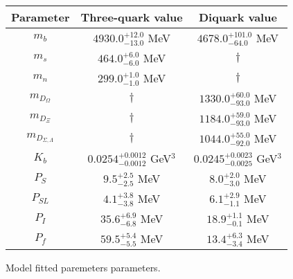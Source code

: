 \begin{tabular}{c | c c}\hline \hline
 Parameter  &  Three-quark value       & Diquark value    \\ \hline
 $m_{b}$ & $4930.0^{+12.0}_{-13.0}$ MeV & $4678.0^{+101.0}_{-64.0}$ MeV \\ 
 $m_{s}$ & $464.0^{+6.0}_{-6.0}$ MeV & $\dagger$ \\ 
 $m_{n}$ & $299.0^{+1.0}_{-1.0}$ MeV & $\dagger$ \\ 
 $m_{D_{\Omega}}$          & $\dagger$ & $1330.0^{+60.0}_{-93.0}$ MeV \\ 
 $m_{D_{\Xi}}$             & $\dagger$ & $1184.0^{+59.0}_{-93.0}$ MeV \\ 
 $m_{D_{\Sigma,\Lambda}}$ & $\dagger$ & $1044.0^{+55.0}_{-92.0}$ MeV \\ 
 $K_b$   & $0.0254^{+0.0012}_{-0.0012}$ GeV$^{3}$ & $0.0245^{+0.0023}_{-0.0025}$ GeV$^{3}$ \\ 
 $P_S$     & $9.5^{+2.5}_{-2.5}$ MeV & $8.0^{+2.0}_{-3.0}$ MeV \\ 
 $P_{SL}$     & $4.1^{+3.8}_{-3.8}$ MeV & $6.1^{+2.9}_{-1.1}$ MeV \\ 
 $P_{I}$     & $35.6^{+6.9}_{-6.8}$ MeV & $18.9^{+1.1}_{-0.1}$ MeV \\ 
 $P_{f}$     & $59.5^{+5.4}_{-5.5}$ MeV & $13.4^{+6.3}_{-3.4}$ MeV \\ 
\hline\hline
\end{tabular}
\caption{Model fitted paremeters parameters.}
\label{tab:comb_fit}

